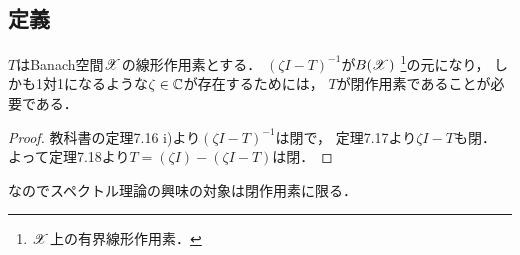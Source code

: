     \subsection{定義}
    \begin{Prop}[p.210]
        $T$はBanach空間$\mathscr{X}$の線形作用素とする．
        $(\zeta I-T)^{-1}$が$B(\mathscr{X})$ \footnote{$\mathscr{X}$上の有界線形作用素．}の元になり，
        しかも1対1になるような$\zeta \in \mathbb{C}$が存在するためには，
        $T$が閉作用素であることが必要である．
    \end{Prop}
    \begin{proof}
        教科書の定理7.16 i)より$(\zeta I-T)^{-1}$は閉で，
        定理7.17より$\zeta I-T$も閉．
        よって定理7.18より$T=(\zeta I)-(\zeta I-T)$は閉．
    \end{proof}
    なのでスペクトル理論の興味の対象は閉作用素に限る．
